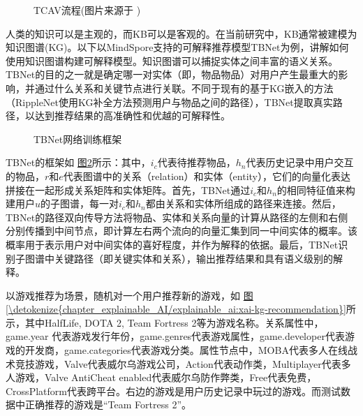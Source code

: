 \documentclass[letterpaper,10pt,english]{sphinxmanual}
\let\sphinxpxdimen\pdfpxdimen\else\newdimen\sphinxpxdimen
\begin{document}
\begin{figure}[H]
\centering
\capstart

\noindent\sphinxincludegraphics[width=800\sphinxpxdimen]{{xai_tcav}.png}
\caption{TCAV流程(图片来源于 )}\label{\detokenize{chapter_explainable_AI/explainable_ai:id28}}\label{\detokenize{chapter_explainable_AI/explainable_ai:xai-tcav}}\end{figure}

\sphinxAtStartPar
人类的知识可以是主观的，而KB可以是客观的。在当前研究中，KB通常被建模为知识图谱(KG)。以下以MindSpore支持的可解释推荐模型TB\sphinxhyphen{}Net为例，讲解如何使用知识图谱构建可解释模型。知识图谱可以捕捉实体之间丰富的语义关系。TB\sphinxhyphen{}Net的目的之一就是确定哪一对实体（即，物品\sphinxhyphen{}物品）对用户产生最重大的影响，并通过什么关系和关键节点进行关联。不同于现有的基于KG嵌入的方法（RippleNet使用KG补全方法预测用户与物品之间的路径），TB\sphinxhyphen{}Net提取真实路径，以达到推荐结果的高准确性和优越的可解释性。

\begin{figure}[H]
\centering
\capstart

\noindent\sphinxincludegraphics[width=800\sphinxpxdimen]{{tb_net}.png}
\caption{TB\sphinxhyphen{}Net网络训练框架}\label{\detokenize{chapter_explainable_AI/explainable_ai:id29}}\label{\detokenize{chapter_explainable_AI/explainable_ai:tb-net}}\end{figure}

\sphinxAtStartPar
TB\sphinxhyphen{}Net的框架如
\hyperref[\detokenize{chapter_explainable_AI/explainable_ai:tb-net}]{图\ref{\detokenize{chapter_explainable_AI/explainable_ai:tb-net}}}所示：其中，\(i_c\)代表待推荐物品，\(h_n\)代表历史记录中用户交互的物品，\(r\)和\(e\)代表图谱中的关系（relation）和实体（entity），它们的向量化表达拼接在一起形成关系矩阵和实体矩阵。首先，TB\sphinxhyphen{}Net通过\(i_c\)和\(h_n\)的相同特征值来构建用户\(u\)的子图谱，每一对\(i_c\)和\(h_n\)都由关系和实体所组成的路径来连接。然后，TB\sphinxhyphen{}Net的路径双向传导方法将物品、实体和关系向量的计算从路径的左侧和右侧分别传播到中间节点，即计算左右两个流向的向量汇集到同一中间实体的概率。该概率用于表示用户对中间实体的喜好程度，并作为解释的依据。最后，TB\sphinxhyphen{}Net识别子图谱中关键路径（即关键实体和关系），输出推荐结果和具有语义级别的解释。

\sphinxAtStartPar
以游戏推荐为场景，随机对一个用户推荐新的游戏，如
\hyperref[\detokenize{chapter_explainable_AI/explainable_ai:xai-kg-recommendation}]{图\ref{\detokenize{chapter_explainable_AI/explainable_ai:xai-kg-recommendation}}}所示，其中Half\sphinxhyphen{}Life, DOTA 2, Team
Fortress 2等为游戏名称。关系属性中，game.year
代表游戏发行年份，game.genres代表游戏属性，game.developer代表游戏的开发商，game.categories代表游戏分类。属性节点中，MOBA代表多人在线战术竞技游戏，Valve代表威尔乌游戏公司，Action代表动作类，Multi\sphinxhyphen{}player代表多人游戏，Valve
Anti\sphinxhyphen{}Cheat
enabled代表威尔乌防作弊类，Free代表免费，Cross\sphinxhyphen{}Platform代表跨平台。右边的游戏是用户历史记录中玩过的游戏。而测试数据中正确推荐的游戏是“Team
Fortress 2”。
\end{document}
